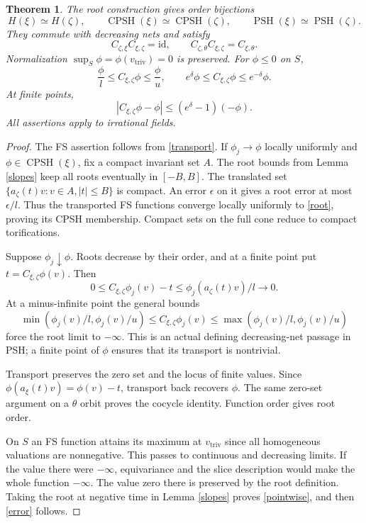 \documentclass[11pt]{article}
\newtheorem{theorem}{Theorem}
\newcommand{\CPSH}{\operatorname{CPSH}}
\newcommand{\PSH}{\operatorname{PSH}}
\newcommand{\triv}{\mathrm{triv}}
\begin{document}
\begin{theorem}\label{orbit-theorem}
The root construction gives order bijections
\[
 H(\xi)\simeq H(\zeta),\qquad
 \CPSH(\xi)\simeq\CPSH(\zeta),\qquad
 \PSH(\xi)\simeq\PSH(\zeta).
\]
They commute with decreasing nets and satisfy
\[
 C_{\zeta,\xi}C_{\xi,\zeta}=\mathrm{id},\qquad
 C_{\zeta,\theta}C_{\xi,\zeta}=C_{\xi,\theta}.
\]
Normalization $\sup_S\phi=\phi(v_\triv)=0$ is preserved.
For $\phi\leq0$ on $S$,
\begin{equation}\label{pointwise}
 \frac{\phi}{l}\leq C_{\xi,\zeta}\phi\leq\frac{\phi}{u},\qquad
 e^\delta\phi\leq C_{\xi,\zeta}\phi\leq e^{-\delta}\phi.
\end{equation}
At finite points,
\begin{equation}\label{error}
 |C_{\xi,\zeta}\phi-\phi|\leq(e^\delta-1)(-\phi).
\end{equation}
All assertions apply to irrational fields.
\end{theorem}
\begin{proof}
The FS assertion follows from \eqref{transport}.
If $\phi_j\to\phi$ locally uniformly and $\phi\in\CPSH(\xi)$, fix a compact invariant set $A$.
The root bounds from Lemma \ref{slopes} keep all roots eventually in $[-B,B]$.
The translated set $\{a_\zeta(t)v:v\in A, |t|\leq B\}$ is compact.
An error $\epsilon$ on it gives a root error at most $\epsilon/l$.
Thus the transported FS functions converge locally uniformly to \eqref{root}, proving its CPSH membership.
Compact sets on the full cone reduce to compact torifications.

Suppose $\phi_j\downarrow\phi$.
Roots decrease by their order, and at a finite point put $t=C_{\xi,\zeta}\phi(v)$.
Then
\[
 0\leq C_{\xi,\zeta}\phi_j(v)-t
 \leq\phi_j(a_\zeta(t)v)/l\longrightarrow0.
\]
At a minus-infinite point the general bounds
\[
 \min(\phi_j(v)/l,\phi_j(v)/u)\leq C_{\xi,\zeta}\phi_j(v)
 \leq\max(\phi_j(v)/l,\phi_j(v)/u)
\]
force the root limit to $-\infty$.
This is an actual defining decreasing-net passage in PSH; a finite point of $\phi$ ensures that its transport is nontrivial.

Transport preserves the zero set and the locus of finite values.
Since $\phi(a_\xi(t)v)=\phi(v)-t$, transport back recovers $\phi$.
The same zero-set argument on a $\theta$ orbit proves the cocycle identity.
Function order gives root order.

On $S$ an FS function attains its maximum at $v_\triv$ since all homogeneous valuations are nonnegative.
This passes to continuous and decreasing limits.
If the value there were $-\infty$, equivariance and the slice description would make the whole function $-\infty$.
The value zero there is preserved by the root definition.
Taking the root at negative time in Lemma \ref{slopes} proves \eqref{pointwise}, and then \eqref{error} follows.
\end{proof}
\end{document}
